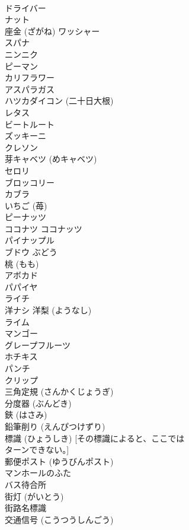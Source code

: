 \documentclass[8pt]{extreport}
\begin{document}
\begin{CJK}{UTF8}{min}
\\	ドライバー
\\	ナット
\\	座金 (ざがね) ワッシャー
\\	スパナ 
\\	ニンニク 
\\	ピーマン
\\	カリフラワー 
\\	アスパラガス 
\\	ハツカダイコン (二十日大根) 
\\	レタス 
\\	ビートルート 
\\	ズッキーニ 
\\	クレソン 
\\	芽キャベツ (めキャベツ) 
\\	セロリ 
\\	ブロッコリー 
\\	カブラ 
\\	いちご (苺)
\\	ピーナッツ
\\	ココナツ ココナッツ
\\	パイナップル
\\	ブドウ ぶどう
\\	桃 (もも)
\\	アボカド
\\	パパイヤ 
\\	ライチ 
\\	洋ナシ 洋梨 (ようなし) 
\\	ライム 
\\	マンゴー
\\	グレープフルーツ 
\\	ホチキス
\\	パンチ
\\	クリップ
\\	三角定規 (さんかくじょうぎ) 
\\	分度器 (ぶんどき) 
\\	鋏 (はさみ)
\\	鉛筆削り (えんぴつけずり) 
\\	標識 (ひょうしき) [その標識によると、ここでは
\\	ターンできない。]
\\	郵便ポスト (ゆうびんポスト)
\\	マンホールのふた
\\	バス待合所
\\	街灯 (がいとう)
\\	街路名標識
\\	交通信号 (こうつうしんごう)

\end{CJK}
\end{document}
